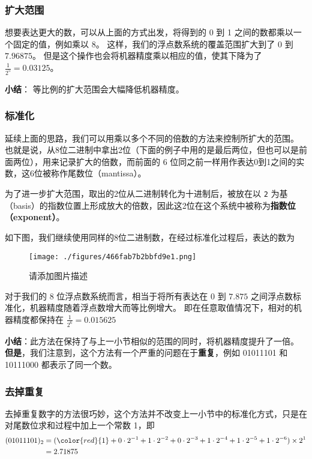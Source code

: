 \subsubsection{扩大范围}

想要表达更大的数，可以从上面的方式出发，将得到的 0 到 1 之间的数都乘以一个固定的值，例如乘以 8。 这样，我们的浮点数系统的覆盖范围扩大到了 $0$ 到 $7.96875$。 但是这个操作也会将机器精度乘以相应的值，使其下降为了  $\frac{1}{2^5}=0.03125$。

\textbf{小结}： 等比例的扩大范围会大幅降低机器精度。

\subsubsection{标准化}

延续上面的思路，我们可以用乘以多个不同的倍数的方法来控制所扩大的范围。 也就是说，从8位二进制中拿出2位（下面的例子中用的是最后两位，但也可以是前面两位），用来记录扩大的倍数，而前面的 6 位同之前一样用作表达0到1之间的实数，这6位被称作尾数位（mantissa）。 

为了进一步扩大范围，取出的2位从二进制转化为十进制后，被放在以 \verb|2| 为基（basis）的指数位置上形成放大的倍数，因此这2位在这个系统中被称为\textbf{指数位（exponent）}。

如下图，我们继续使用同样的8位二进制数，在经过标准化过程后，表达的数为

\begin{figure}[ht]
\centering
\texttt{[image: ./figures/466fab7b2bbfd9e1.png]}
\caption{请添加图片描述} \label{fig_CmArit_1}
\end{figure}

对于我们的 8 位浮点数系统而言，相当于将所有表达在 $0$ 到 $7.875$ 之间浮点数标准化，机器精度随着浮点数增大而等比例增大。 即在任意取值情况下，相对的机器精度都保持在 $\frac{1}{2^6}=0.015625$

\textbf{小结}：此方法在保持了与上一小节相似的范围的同时，将机器精度提升了一倍。 \textbf{但是}，我们注意到，这个方法有一个严重的问题在于\textbf{重复}，例如 01011101 和 10111000 都表示了同一个数。

\subsubsection{去掉重复}

去掉重复数字的方法很巧妙，这个方法并不改变上一小节中的标准化方式，只是在对尾数位求和过程中加上一个常数 1，即
\begin{equation}
\begin{aligned}
(01011101)_2 &=({\color{red}{1}}+0\cdot2^{-1}+1\cdot2^{-2}+0\cdot2^{-3}+1\cdot2^{-4}+1\cdot2^{-5}+1\cdot2^{-6})\times2^1\\
&= 2.71875
\end{aligned}
\end{equation}

